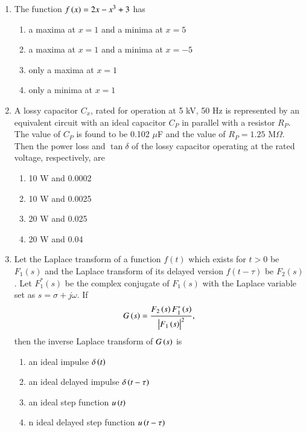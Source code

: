 \documentclass[journal]{IEEEtran}
\begin{document}
\begin{enumerate}[start=27]
	\item The function $f\left(x\right) = 2x - x^3 + 3$ has
\begin{enumerate}
\item a maxima at $x = 1$ and a minima at $x = 5$
\item a maxima at $x = 1$ and a minima at $x = -5$
\item only a maxima at $x = 1$
\item only a minima at $x = 1$
\end{enumerate}


\item A lossy capacitor $C_x$, rated for operation at 5 kV, 50 Hz is represented by an equivalent circuit with an ideal capacitor $C_P$ in parallel with a resistor $R_P$. The value of $C_P$ is found to be 0.102 $\mu$F and the value of $R_P = 1.25$ M$\Omega$. Then the power loss and $\tan \delta$ of the lossy capacitor operating at the rated voltage, respectively, are
\begin{multicols}{2}
\begin{enumerate}
\item  10 W and 0.0002
\item  10 W and 0.0025
\item  20 W and 0.025
\item  20 W and 0.04
\end{enumerate}
\end{multicols}

\item Let the Laplace transform of a function $f(t)$ which exists for $t > 0$ be $F_1(s)$ and the Laplace transform of its delayed version $f(t - \tau)$ be $F_2(s)$. Let $F_1^*(s)$ be the complex conjugate of $F_1(s)$ with the Laplace variable set as $s = \sigma + j\omega$. If 
\begin{align*}
G\left(s\right) = \frac{F_2\left(s\right)F_1^*\left(s\right)}{\begin{vmatrix}F_1\left(s\right)\end{vmatrix}^2}, 
\end{align*}
then the inverse Laplace transform of $G\left(s\right)$ is
\begin{multicols}{2}
\begin{enumerate}
\item an ideal impulse $\delta\left(t\right)$
\item  an ideal delayed impulse $\delta\left(t - \tau\right)$
\item  an ideal step function $u\left(t\right)$
\item n ideal delayed step function $u\left(t - \tau\right)$
\end{enumerate}
\end{multicols}


\end{enumerate}
\end{document}
